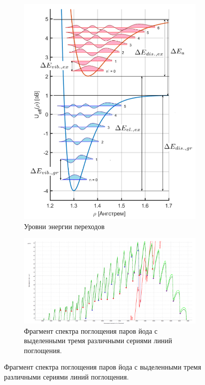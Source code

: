 \documentclass[11.5pt,a4paper,russian]{article}
\begin{document}
\begin{figure}[ht!]
\centering
    \begin{subfigure}[b]{0.3\textwidth}
  \centering
  \includegraphics[width=\textwidth]{31d5f3f2-62f2-4406-9102-ef96d1b02bcb}  \caption{Уровни энергии переходов}
  \label{fig:analyze_problem}
\end{subfigure}
\begin{subfigure}[b]{0.4\textwidth}
  \centering
  \includegraphics[width=\textwidth]{215eb016-6116-47f0-b2c0-8b7fd67629ac}  \caption{Фрагмент спектра поглощения паров йода с выделенными тремя различными сериями линий поглощения.}
  \label{fig:series}
\end{subfigure}
\end{figure}
\end{document}
